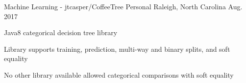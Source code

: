 \begin{cventries}
\cventry
	{Machine Learning - jtcasper/CoffeeTree} %
	{Personal} %
	{Raleigh, North Carolina} %
	{Aug. 2017} %
	{
		\begin{cvitems}
			\item {Java8 categorical decision tree library}
			\item {Library supports training, prediction, multi-way and binary splits, and soft equality}
			\item {No other library available allowed categorical comparisons with soft equality}
		\end{cvitems}
	}









\end{cventries}